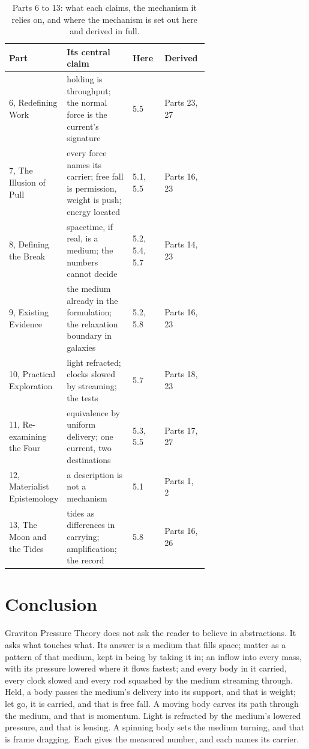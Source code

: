 \begin{table}[t]\centering\small
\caption{Parts 6 to 13: what each claims, the mechanism it relies on, and where the mechanism is set out here and derived in full.}
\begin{tabularx}{\linewidth}{@{}>{\raggedright}p{0.17\linewidth} >{\raggedright}p{0.33\linewidth} >{\raggedright}p{0.16\linewidth} X@{}}\toprule
\textbf{Part} & \textbf{Its central claim} & \textbf{Here} & \textbf{Derived}\\\midrule
6, Redefining Work & holding is throughput; the normal force is the current's signature & 5.5 & Parts 23, 27\\
7, The Illusion of Pull & every force names its carrier; free fall is permission, weight is push; energy located & 5.1, 5.5 & Parts 16, 23\\
8, Defining the Break & spacetime, if real, is a medium; the numbers cannot decide & 5.2, 5.4, 5.7 & Parts 14, 23\\
9, Existing Evidence & the medium already in the formulation; the relaxation boundary in galaxies & 5.2, 5.8 & Parts 16, 23\\
10, Practical Exploration & light refracted; clocks slowed by streaming; the tests & 5.7 & Parts 18, 23\\
11, Re-examining the Four & equivalence by uniform delivery; one current, two destinations & 5.3, 5.5 & Parts 17, 27\\
12, Materialist Epistemology & a description is not a mechanism & 5.1 & Parts 1, 2\\
13, The Moon and the Tides & tides as differences in carrying; amplification; the record & 5.8 & Parts 16, 26\\\bottomrule
\end{tabularx}\label{tab:map}\end{table}

\section*{Conclusion}

Graviton Pressure Theory does not ask the reader to believe in abstractions. It asks what touches what. Its answer is a medium that fills space; matter as a pattern of that medium, kept in being by taking it in; an inflow into every mass, with its pressure lowered where it flows fastest; and every body in it carried, every clock slowed and every rod squashed by the medium streaming through. Held, a body passes the medium's delivery into its support, and that is weight; let go, it is carried, and that is free fall. A moving body carves its path through the medium, and that is momentum. Light is refracted by the medium's lowered pressure, and that is lensing. A spinning body sets the medium turning, and that is frame dragging. Each gives the measured number, and each names its carrier.

